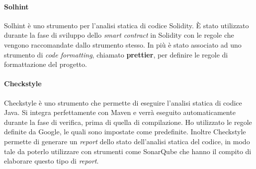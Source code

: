 \paragraph{Solhint}
Solhint è uno strumento per l'analisi statica di codice Solidity. È stato utilizzato durante la fase di sviluppo dello \textit{smart contract} in Solidity con le regole che vengono raccomandate dallo strumento stesso. In più è stato associato ad uno strumento di \textit{code formatting}, chiamato \textbf{prettier}, per definire le regole di formattazione del progetto.


\paragraph{Checkstyle}
Checkstyle è uno strumento che permette di eseguire l'analisi statica di codice Java. Si integra perfettamente con Maven e verrà eseguito automaticamente durante la fase di verifica, prima di quella di compilazione. Ho utilizzato le regole definite da Google, le quali sono impostate come predefinite.
Inoltre Checkstyle permette di generare un \textit{report} dello stato dell'analisi statica del codice, in modo tale da poterlo utilizzare con strumenti come SonarQube che hanno il compito di elaborare questo tipo di \textit{report}.
